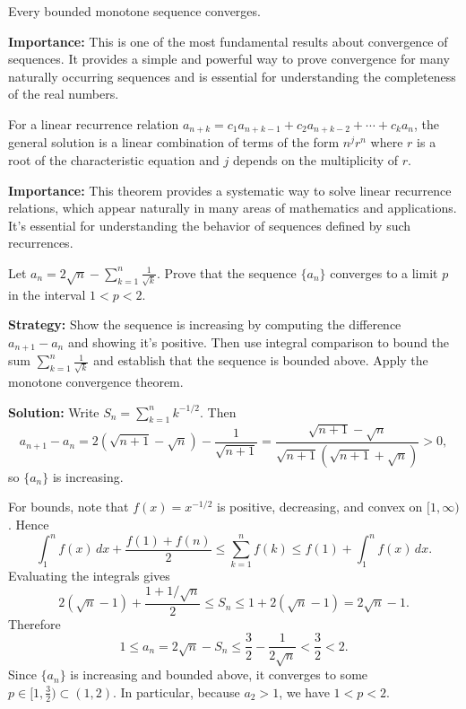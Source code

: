 \begin{theorem}
Every bounded monotone sequence converges.
\end{theorem}

\noindent\textbf{Importance:} This is one of the most fundamental results about convergence of sequences. It provides a simple and powerful way to prove convergence for many naturally occurring sequences and is essential for understanding the completeness of the real numbers.



\begin{theorem}
For a linear recurrence relation $a_{n+k} = c_1 a_{n+k-1} + c_2 a_{n+k-2} + \cdots + c_k a_n$, the general solution is a linear combination of terms of the form $n^j r^n$ where $r$ is a root of the characteristic equation and $j$ depends on the multiplicity of $r$.
\end{theorem}

\noindent\textbf{Importance:} This theorem provides a systematic way to solve linear recurrence relations, which appear naturally in many areas of mathematics and applications. It's essential for understanding the behavior of sequences defined by such recurrences.





\begin{problembox}
\begin{problemstatement}
Let \(a_n = 2\sqrt{n}-\sum_{k=1}^n \frac{1}{\sqrt{k}}\). Prove that the sequence \(\{a_n\}\) converges to a limit \(p\) in the interval \(1 < p < 2\).
\end{problemstatement}
\end{problembox}

\noindent\textbf{Strategy:} Show the sequence is increasing by computing the difference \(a_{n+1}-a_n\) and showing it's positive. Then use integral comparison to bound the sum \(\sum_{k=1}^n \frac{1}{\sqrt{k}}\) and establish that the sequence is bounded above. Apply the monotone convergence theorem.

\bigskip\noindent\textbf{Solution:}
Write \(S_n=\sum_{k=1}^n k^{-1/2}\). Then
\[a_{n+1}-a_n = 2(\sqrt{n+1}-\sqrt{n})-\frac{1}{\sqrt{n+1}} = \frac{\sqrt{n+1}-\sqrt{n}}{\sqrt{n+1}(\sqrt{n+1}+\sqrt{n})} > 0,\]
so \(\{a_n\}\) is increasing.

For bounds, note that \(f(x)=x^{-1/2}\) is positive, decreasing, and convex on \([1,\infty)\). Hence
\[\int_{1}^{n} f(x)\,dx + \frac{f(1)+f(n)}{2} \le \sum_{k=1}^{n} f(k) \le f(1)+\int_{1}^{n} f(x)\,dx.\]
Evaluating the integrals gives
\[2(\sqrt{n}-1)+\frac{1+1/\sqrt{n}}{2} \le S_n \le 1+2(\sqrt{n}-1)=2\sqrt{n}-1.\]
Therefore
\[1 \le a_n = 2\sqrt{n}-S_n \le \frac{3}{2}-\frac{1}{2\sqrt{n}} < \frac{3}{2} < 2.\]
Since \(\{a_n\}\) is increasing and bounded above, it converges to some \(p\in[1,\tfrac{3}{2})\subset(1,2)\). In particular, because \(a_2>1\), we have \(1<p<2\).




